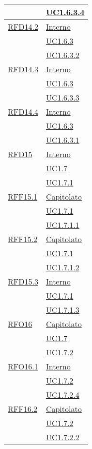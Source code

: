 \begin{longtable}{|>{\centering}m{5cm}|m{5cm}<{\centering}|}
& \hyperref[UC1.6.3.4]{UC1.6.3.4}\\ \hline
\hyperlink{RFD14.2}{RFD14.2} & \hyperlink{Interno}{Interno}\\
& \hyperref[UC1.6.3]{UC1.6.3}\\
& \hyperref[UC1.6.3.2]{UC1.6.3.2}\\ \hline
\hyperlink{RFD14.3}{RFD14.3} & \hyperlink{Interno}{Interno}\\
& \hyperref[UC1.6.3]{UC1.6.3}\\
& \hyperref[UC1.6.3.3]{UC1.6.3.3}\\ \hline
\hyperlink{RFD14.4}{RFD14.4} & \hyperlink{Interno}{Interno}\\
& \hyperref[UC1.6.3]{UC1.6.3}\\
& \hyperref[UC1.6.3.1]{UC1.6.3.1}\\ \hline
\hyperlink{RFD15}{RFD15} & \hyperlink{Interno}{Interno}\\
& \hyperref[UC1.7]{UC1.7}\\
& \hyperref[UC1.7.1]{UC1.7.1}\\ \hline
\hyperlink{RFF15.1}{RFF15.1} & \hyperlink{Capitolato}{Capitolato}\\
& \hyperref[UC1.7.1]{UC1.7.1}\\
& \hyperref[UC1.7.1.1]{UC1.7.1.1}\\ \hline
\hyperlink{RFF15.2}{RFF15.2} & \hyperlink{Capitolato}{Capitolato}\\
& \hyperref[UC1.7.1]{UC1.7.1}\\
& \hyperref[UC1.7.1.2]{UC1.7.1.2}\\ \hline
\hyperlink{RFD15.3}{RFD15.3} & \hyperlink{Interno}{Interno}\\
& \hyperref[UC1.7.1]{UC1.7.1}\\
& \hyperref[UC1.7.1.3]{UC1.7.1.3}\\ \hline
\hyperlink{RFO16}{RFO16} & \hyperlink{Capitolato}{Capitolato}\\
& \hyperref[UC1.7]{UC1.7}\\
& \hyperref[UC1.7.2]{UC1.7.2}\\ \hline
\hyperlink{RFO16.1}{RFO16.1} & \hyperlink{Interno}{Interno}\\
& \hyperref[UC1.7.2]{UC1.7.2}\\
& \hyperref[UC1.7.2.4]{UC1.7.2.4}\\ \hline
\hyperlink{RFF16.2}{RFF16.2} & \hyperlink{Capitolato}{Capitolato}\\
& \hyperref[UC1.7.2]{UC1.7.2}\\
& \hyperref[UC1.7.2.2]{UC1.7.2.2}\\ \hline

\end{longtable}
